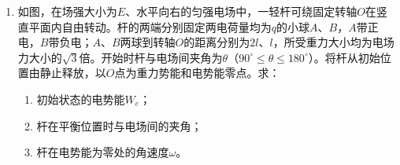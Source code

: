 \begin{enumerate}
\item 
{}
如图，在场强大小为$ E $、水平向右的匀强电场中，一轻杆可绕固定转轴$ O $在竖直平面内自由转动。杆的两端分别固定两电荷量均为$ q $的小球$ A $、$ B $，$ A $带正电，$ B $带负电；$ A $、$ B $两球到转轴$ O $的距离分别为$ 2l $、$ l $，所受重力大小均为电场力大小的$ \sqrt{3} $倍。开始时杆与电场间夹角为$ \theta $（$ 90 ^{ \circ } \leq \theta \leq 180 ^{ \circ } $）。将杆从初始位置由静止释放，以$ O $点为重力势能和电势能零点。求：
\begin{enumerate}
\renewcommand{\labelenumi}{\arabic{enumi}.}
\item
初始状态的电势能$ W_e $；
\item 
杆在平衡位置时与电场间的夹角；
\item 
杆在电势能为零处的角速度$ \omega $。



\end{enumerate}
\begin{figure}[h!]
\flushright

\end{figure}











\end{enumerate}




